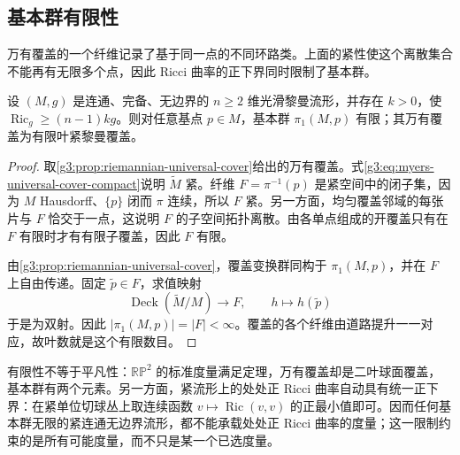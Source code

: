 \subsection{基本群有限性}
\label{g3:subsec:0801:04}

万有覆盖的一个纤维记录了基于同一点的不同环路类。上面的紧性使这个离散集合不能再有无限多个点，因此 Ricci 曲率的正下界同时限制了基本群。

\begin{corollary}\label{g3:cor:myers-finite-fundamental-group}
	设 \((M,g)\) 是连通、完备、无边界的 \(n\ge2\) 维光滑黎曼流形，并存在 \(k>0\)，使 \(\operatorname{Ric}_g\ge(n-1)k g\)。则对任意基点 \(p\in M\)，基本群 \(\pi_1(M,p)\) 有限；其万有覆盖为有限叶紧黎曼覆盖。
\end{corollary}
\begin{proof}
	取\cref{g3:prop:riemannian-universal-cover}给出的万有覆盖。式\eqref{g3:eq:myers-universal-cover-compact}说明 \(\widetilde M\) 紧。纤维 \(F=\pi^{-1}(p)\) 是紧空间中的闭子集，因为 \(M\) Hausdorff、\(\{p\}\) 闭而 \(\pi\) 连续，所以 \(F\) 紧。另一方面，均匀覆盖邻域的每张片与 \(F\) 恰交于一点，这说明 \(F\) 的子空间拓扑离散。由各单点组成的开覆盖只有在 \(F\) 有限时才有有限子覆盖，因此 \(F\) 有限。

	由\cref{g3:prop:riemannian-universal-cover}，覆盖变换群同构于 \(\pi_1(M,p)\)，并在 \(F\) 上自由传递。固定 \(\widetilde p\in F\)，求值映射
	\[
		\operatorname{Deck}(\widetilde M/M)\longrightarrow F,
		\qquad h\longmapsto h(\widetilde p)
	\]
	于是为双射。因此 \(|\pi_1(M,p)|=|F|<\infty\)。覆盖的各个纤维由道路提升一一对应，故叶数就是这个有限数目。
\end{proof}

有限性不等于平凡性：\(\mathbb{RP}^2\) 的标准度量满足定理，万有覆盖却是二叶球面覆盖，基本群有两个元素。另一方面，紧流形上的处处正 Ricci 曲率自动具有统一正下界：在紧单位切球丛上取连续函数 \(v\mapsto\operatorname{Ric}(v,v)\) 的正最小值即可。因而任何基本群无限的紧连通无边界流形，都不能承载处处正 Ricci 曲率的度量；这一限制约束的是所有可能度量，而不只是某一个已选度量。
